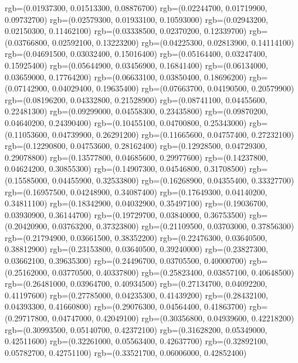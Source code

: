 {{        rgb=(0.01937300, 0.01513300, 0.08876700)
        rgb=(0.02244700, 0.01719900, 0.09732700)
        rgb=(0.02579300, 0.01933100, 0.10593000)
        rgb=(0.02943200, 0.02150300, 0.11462100)
        rgb=(0.03338500, 0.02370200, 0.12339700)
        rgb=(0.03766800, 0.02592100, 0.13223200)
        rgb=(0.04225300, 0.02813900, 0.14114100)
        rgb=(0.04691500, 0.03032400, 0.15016400)
        rgb=(0.05164400, 0.03247400, 0.15925400)
        rgb=(0.05644900, 0.03456900, 0.16841400)
        rgb=(0.06134000, 0.03659000, 0.17764200)
        rgb=(0.06633100, 0.03850400, 0.18696200)
        rgb=(0.07142900, 0.04029400, 0.19635400)
        rgb=(0.07663700, 0.04190500, 0.20579900)
        rgb=(0.08196200, 0.04332800, 0.21528900)
        rgb=(0.08741100, 0.04455600, 0.22481300)
        rgb=(0.09299000, 0.04558300, 0.23435800)
        rgb=(0.09870200, 0.04640200, 0.24390400)
        rgb=(0.10455100, 0.04700800, 0.25343000)
        rgb=(0.11053600, 0.04739900, 0.26291200)
        rgb=(0.11665600, 0.04757400, 0.27232100)
        rgb=(0.12290800, 0.04753600, 0.28162400)
        rgb=(0.12928500, 0.04729300, 0.29078800)
        rgb=(0.13577800, 0.04685600, 0.29977600)
        rgb=(0.14237800, 0.04624200, 0.30855300)
        rgb=(0.14907300, 0.04546800, 0.31708500)
        rgb=(0.15585000, 0.04455900, 0.32533800)
        rgb=(0.16268900, 0.04355400, 0.33327700)
        rgb=(0.16957500, 0.04248900, 0.34087400)
        rgb=(0.17649300, 0.04140200, 0.34811100)
        rgb=(0.18342900, 0.04032900, 0.35497100)
        rgb=(0.19036700, 0.03930900, 0.36144700)
        rgb=(0.19729700, 0.03840000, 0.36753500)
        rgb=(0.20420900, 0.03763200, 0.37323800)
        rgb=(0.21109500, 0.03703000, 0.37856300)
        rgb=(0.21794900, 0.03661500, 0.38352200)
        rgb=(0.22476300, 0.03640500, 0.38812900)
        rgb=(0.23153800, 0.03640500, 0.39240000)
        rgb=(0.23827300, 0.03662100, 0.39635300)
        rgb=(0.24496700, 0.03705500, 0.40000700)
        rgb=(0.25162000, 0.03770500, 0.40337800)
        rgb=(0.25823400, 0.03857100, 0.40648500)
        rgb=(0.26481000, 0.03964700, 0.40934500)
        rgb=(0.27134700, 0.04092200, 0.41197600)
        rgb=(0.27785000, 0.04235300, 0.41439200)
        rgb=(0.28432100, 0.04393300, 0.41660800)
        rgb=(0.29076300, 0.04564400, 0.41863700)
        rgb=(0.29717800, 0.04747000, 0.42049100)
        rgb=(0.30356800, 0.04939600, 0.42218200)
        rgb=(0.30993500, 0.05140700, 0.42372100)
        rgb=(0.31628200, 0.05349000, 0.42511600)
        rgb=(0.32261000, 0.05563400, 0.42637700)
        rgb=(0.32892100, 0.05782700, 0.42751100)
        rgb=(0.33521700, 0.06006000, 0.42852400)
}}
